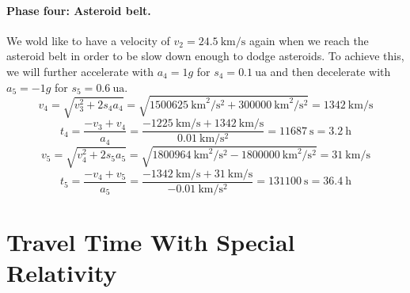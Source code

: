 \documentclass[10pt]{article}
\numberwithin{equation}{section}
\begin{document}
	\paragraph{Phase four: Asteroid belt.}
	
	We wold like to have a velocity of $v_2 = \SI{24.5}{\km\per\s}$ again when we reach the asteroid belt in order to be slow down enough to dodge asteroids. To achieve this, we will further accelerate with $a_4 = 1 g$ for $s_4 = \SI{0.1}{\astronomicalunit}$ and then decelerate with $a_5 = -1 g$ for $s_5 = \SI{0.6}{\astronomicalunit}$.
	\begin{equation}
		v_4 = \sqrt{v^2_3 + 2s_4 a_4}
		= \sqrt{\SI{1500625}{\km\squared\per\s\squared} + \SI{300000}{\km\squared\per\s\squared}}
		= \SI{1342}{\km\per\s} \end{equation}
	\begin{equation}
		t_4 = \frac{-v_3 + v_4}{a_4}
		= \frac{\SI{-1225}{\km\per\s} + \SI{1342}{\km\per\s}}{\SI{0.01}{\km\per\s\squared}}
		= \SI{11687}{\s} = \SI{3.2}{\hour} \end{equation}
	\begin{equation}
		v_5 = \sqrt{v^2_4 + 2s_5 a_5}
		= \sqrt{\SI{1800964}{\km\squared\per\s\squared} - \SI{1800000}{\km\squared\per\s\squared}}
		= \SI{31}{\km\per\s} \end{equation}
	\begin{equation}
		t_5 = \frac{-v_4 + v_5}{a_5}
	= \frac{\SI{-1342}{\km\per\s} + \SI{31}{\km\per\s}}{\SI{-0.01}{\km\per\s\squared}}
	= \SI{131100}{\s} = \SI{36.4}{\hour} \end{equation}
	
	
	\section{Travel Time With Special Relativity}
\end{document}
